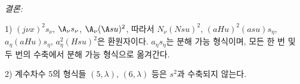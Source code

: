 
\noindent\emph{결론:}

1) $(j\nu x)^2s_\nu$, $\A_\nu s_\nu$, $\A_\nu(\A su)^2$, 따라서 $N_\nu(Nsu)^2$, $(aHu)^2(asu)s_\eta$, $a_\eta(aHu)s_\eta$, $a_\eta^2(Hsu)^2$은 환원자이다. $a_\eta s_\eta$는 분해 가능 형식이며, 모든 한 번 및 두 번의 수축에서 분해 가능 형식으로 옮겨간다.

2) 계수차수 5의 형식들 $(5,\lambda)$, $(6,\lambda)$ 등은 $s^2$과 수축되지 않는다.
